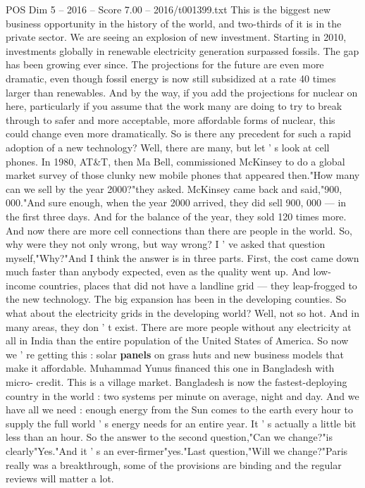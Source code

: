 \begin{textsample}{POS Dim 5 – 2016 – Score 7.00 – 2016/t001399.txt}
This is the biggest new business opportunity in the history of the world, and two-thirds of it is in the private sector.
We are seeing an explosion of new investment.
Starting in 2010, investments globally in renewable electricity generation surpassed fossils.
The gap has been growing ever since.
The projections for the future are even more dramatic, even though fossil energy is now still subsidized at a rate 40 times larger than renewables.
And by the way, if you add the projections for nuclear on here, particularly if you assume that the work many are doing to try to break through to safer and more acceptable, more affordable forms of nuclear, this could change even more dramatically.
So is there any precedent for such a rapid adoption of a new technology?
Well, there are many, but let ' s look at cell phones.
In 1980, AT\&T, then Ma Bell, commissioned McKinsey to do a global market survey of those clunky new mobile phones that appeared then."How many can we sell by the year 2000?"they asked.
McKinsey came back and said,"900, 000."And sure enough, when the year 2000 arrived, they did sell 900, 000 — in the first three days.
And for the balance of the year, they sold 120 times more.
And now there are more cell connections than there are people in the world.
So, why were they not only wrong, but way wrong?
I ' ve asked that question myself,"Why?"And I think the answer is in three parts.
First, the cost came down much faster than anybody expected, even as the quality went up.
And low-income countries, places that did not have a landline grid — they leap-frogged to the new technology.
The big expansion has been in the developing counties.
So what about the electricity grids in the developing world?
Well, not so hot.
And in many areas, they don ' t exist.
There are more people without any electricity at all in India than the entire population of the United States of America.
So now we ' re getting this : solar \textbf{panels} on grass huts and new business models that make it affordable.
Muhammad Yunus financed this one in Bangladesh with micro- credit.
This is a village market.
Bangladesh is now the fastest-deploying country in the world : two systems per minute on average, night and day.
And we have all we need : enough energy from the Sun comes to the earth every hour to supply the full world ' s energy needs for an entire year.
It ' s actually a little bit less than an hour.
So the answer to the second question,"Can we change?"is clearly"Yes."And it ' s an ever-firmer"yes."Last question,"Will we change?"Paris really was a breakthrough, some of the provisions are binding and the regular reviews will matter a lot.

\end{textsample}

